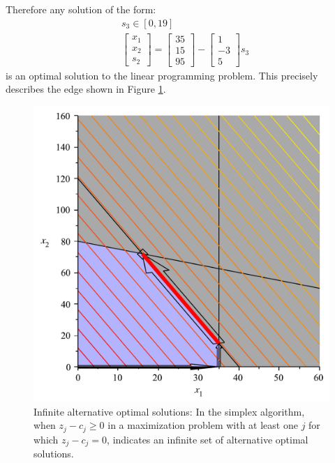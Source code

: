 \begin{example}
Therefore any solution of the form:
\begin{equation}
\begin{aligned}
&s_3 \in [0,19]\\
&\begin{bmatrix}
x_1\\
x_2\\
s_2
\end{bmatrix} = 
\begin{bmatrix}35\\15\\95\end{bmatrix} - 
\begin{bmatrix}1\\-3\\5\end{bmatrix}s_3
\end{aligned}
\label{eqn:InfAltOptSimplex}
\end{equation}
is an optimal solution to the linear programming problem. This precisely describes the edge shown in Figure \ref{fig:InfiniteOptSoln2}.
\begin{figure}[htbp]
\centering
\includegraphics[scale=0.35]{InfOptSimplex.pdf}
\caption{Infinite alternative optimal solutions: In the simplex algorithm, when $z_j - c_j \geq 0$ in a maximization problem with at least one $j$ for which $z_j - c_j = 0$, indicates an infinite set of alternative optimal solutions.}
\label{fig:InfiniteOptSoln2}
\end{figure}
\end{example}

